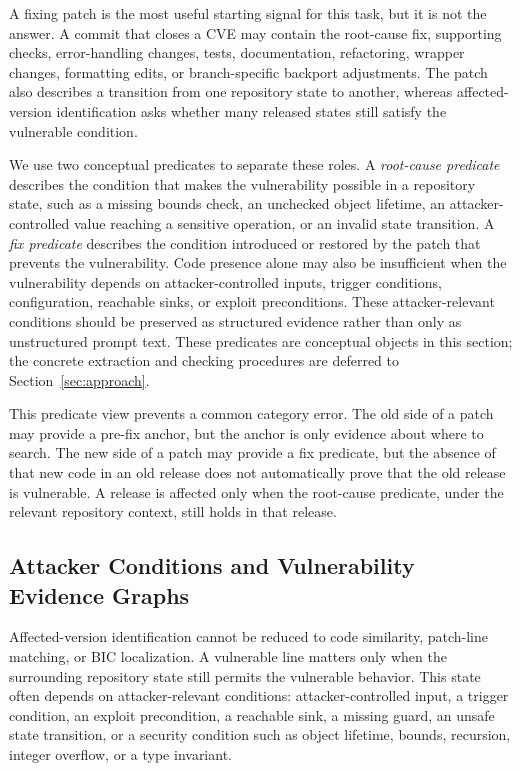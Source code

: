 A fixing patch is the most useful starting signal for this task, but it is not the answer. A commit that closes a CVE may contain the root-cause fix, supporting checks, error-handling changes, tests, documentation, refactoring, wrapper changes, formatting edits, or branch-specific backport adjustments. The patch also describes a transition from one repository state to another, whereas affected-version identification asks whether many released states still satisfy the vulnerable condition.

We use two conceptual predicates to separate these roles. A \emph{root-cause predicate} describes the condition that makes the vulnerability possible in a repository state, such as a missing bounds check, an unchecked object lifetime, an attacker-controlled value reaching a sensitive operation, or an invalid state transition. A \emph{fix predicate} describes the condition introduced or restored by the patch that prevents the vulnerability. Code presence alone may also be insufficient when the vulnerability depends on attacker-controlled inputs, trigger conditions, configuration, reachable sinks, or exploit preconditions. These attacker-relevant conditions should be preserved as structured evidence rather than only as unstructured prompt text. These predicates are conceptual objects in this section; the concrete extraction and checking procedures are deferred to Section~\ref{sec:approach}.

This predicate view prevents a common category error. The old side of a patch may provide a pre-fix anchor, but the anchor is only evidence about where to search. The new side of a patch may provide a fix predicate, but the absence of that new code in an old release does not automatically prove that the old release is vulnerable. A release is affected only when the root-cause predicate, under the relevant repository context, still holds in that release.

\subsection{Attacker Conditions and Vulnerability Evidence Graphs}

Affected-version identification cannot be reduced to code similarity, patch-line matching, or BIC localization. A vulnerable line matters only when the surrounding repository state still permits the vulnerable behavior. This state often depends on attacker-relevant conditions: attacker-controlled input, a trigger condition, an exploit precondition, a reachable sink, a missing guard, an unsafe state transition, or a security condition such as object lifetime, bounds, recursion, integer overflow, or a type invariant.

